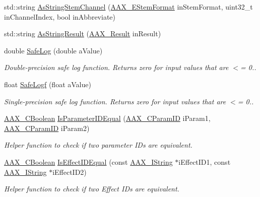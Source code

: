 \begin{DoxyCompactItemize}
\item 
std\+::string \mbox{\hyperlink{a00852_adfab6bf193c09266ecec2069b8da0c5c}{As\+String\+Stem\+Channel}} (\mbox{\hyperlink{a00491_ad8af5ef008b2bd478add9a0acb0a1d85}{A\+A\+X\+\_\+\+E\+Stem\+Format}} in\+Stem\+Format, uint32\+\_\+t in\+Channel\+Index, bool in\+Abbreviate)
\item 
std\+::string \mbox{\hyperlink{a00852_a354029650cebc5f23636c9984a65ea0d}{As\+String\+Result}} (\mbox{\hyperlink{a00392_a4d8f69a697df7f70c3a8e9b8ee130d2f}{A\+A\+X\+\_\+\+Result}} in\+Result)
\item 
double \mbox{\hyperlink{a00852_ae8de30637f08cd29bb0e27526ce9e21b}{Safe\+Log}} (double a\+Value)
\begin{DoxyCompactList}\small\item\em Double-\/precision safe log function. Returns zero for input values that are $<$= 0.. \end{DoxyCompactList}\item 
float \mbox{\hyperlink{a00852_ad762727aac31ad8b7bba8b67a4bc2edc}{Safe\+Logf}} (float a\+Value)
\begin{DoxyCompactList}\small\item\em Single-\/precision safe log function. Returns zero for input values that are $<$= 0.. \end{DoxyCompactList}\item 
\mbox{\hyperlink{a00392_aa216506530f1d19a2965931ced2b274b}{A\+A\+X\+\_\+\+C\+Boolean}} \mbox{\hyperlink{a00852_ae4d1a0a925aa954899fec653dc041b75}{Is\+Parameter\+I\+D\+Equal}} (\mbox{\hyperlink{a00392_a1440c756fe5cb158b78193b2fc1780d1}{A\+A\+X\+\_\+\+C\+Param\+ID}} i\+Param1, \mbox{\hyperlink{a00392_a1440c756fe5cb158b78193b2fc1780d1}{A\+A\+X\+\_\+\+C\+Param\+ID}} i\+Param2)
\begin{DoxyCompactList}\small\item\em Helper function to check if two parameter I\+Ds are equivalent. \end{DoxyCompactList}\item 
\mbox{\hyperlink{a00392_aa216506530f1d19a2965931ced2b274b}{A\+A\+X\+\_\+\+C\+Boolean}} \mbox{\hyperlink{a00852_aef81989128dcac01f2be8fd25096540f}{Is\+Effect\+I\+D\+Equal}} (const \mbox{\hyperlink{a01873}{A\+A\+X\+\_\+\+I\+String}} $\ast$i\+Effect\+I\+D1, const \mbox{\hyperlink{a01873}{A\+A\+X\+\_\+\+I\+String}} $\ast$i\+Effect\+I\+D2)
\begin{DoxyCompactList}\small\item\em Helper function to check if two Effect I\+Ds are equivalent. \end{DoxyCompactList}\item 

\end{DoxyCompactItemize}
